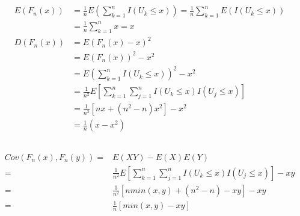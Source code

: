 \documentclass[a4paper]{article}
\begin{document}
\subsection{}

\begin{equation}
    \begin{aligned}
        E(F_n(x))&=\frac{1}{n}E(\sum_{k=1}^{n}I(U_k\le x))=\frac{1}{n}\sum_{k=1}^{n}E(I(U_k\le x))\\\nonumber
        &=\frac{1}{n}\sum_{k=1}^{n}x=x\\
        D(F_n(x))&=E(F_n(x)-x)^2\\
        &=E(F_n(x))^2-x^2\\
        &=E(\sum_{k=1}^{n}I(U_k\le x))^2-x^2\\
        &=\frac{1}{n^2}E[\sum_{k=1}^{n}\sum_{j=1}^{n}I(U_k\le x)I(U_j\le x)]\\
        &=\frac{1}{n^2}[nx+(n^2-n)x^2]-x^2\\
        &=\frac{1}{n}(x-x^2)
    \end{aligned}
\end{equation}

\subsection{}
\begin{equation}
    \begin{aligned}
        Cov(F_n(x),F_n(y))=&E(XY)-E(X)E(Y)\\\nonumber
        =&\frac{1}{n^2}E[\sum_{k=1}^{n}\sum_{j=1}^{n}I(U_k\le x)I(U_j\le x)]-xy\\
        =&\frac{1}{n^2}[nmin(x,y)+(n^2-n)-xy]-xy\\
        =&\frac{1}{n}[min(x,y)-xy]
    \end{aligned}
\end{equation}
\end{document}
